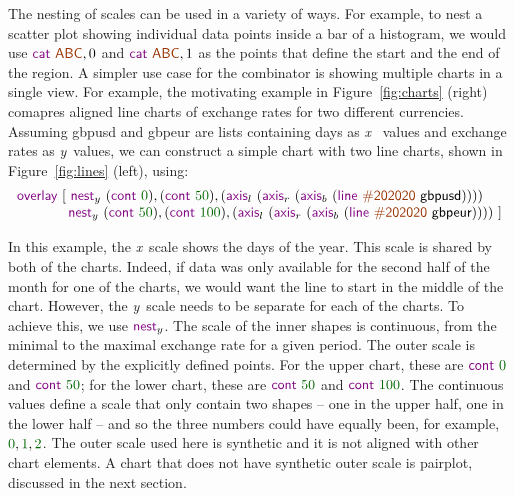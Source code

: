 \documentclass{jfp}
\newcommand{\X}{\emph{x}\ }
\newcommand{\Y}{\emph{y}\ }
\newcommand{\num}[1]{\textcolor{numclr}{#1}}
\newcommand{\strf}[1]{\textnormal{\textcolor{strclr}{\sffamily #1}}}
\newcommand{\ident}[1]{\textnormal{\textcolor{idclr}{\sffamily #1}}}
\newcommand{\kvd}[1]{\textnormal{\textcolor{kvdclr}{\sffamily #1}}}
\begin{document}
The nesting of scales can be used in a variety of ways. For example, to nest a scatter plot
showing individual data points inside a bar of a histogram, we would use $\kvd{cat}~\strf{ABC}, 0$
and $\kvd{cat}~\strf{ABC}, 1$ as the points that define the start and the end of the region. A simpler
use case for the combinator is showing multiple charts in a single view. For example, the motivating example
in Figure~\ref{fig:charts} (right) comapres aligned line charts of exchange rates for two
different currencies. Assuming \ident{gbpusd} and \ident{gbpeur} are lists containing days as \X
values and exchange rates as \Y values, we can construct a simple chart with two line charts,
shown in Figure~\ref{fig:lines} (left), using:
%
\begin{equation*}
\begin{array}{l}
\kvd{overlay}~[~
\kvd{nest}_y~(\kvd{cont}~\num{0}),(\kvd{cont}~\num{50}), (\kvd{axis}_l~(\kvd{axis}_r~(\kvd{axis}_b~(\kvd{line}~\strf{\#202020}~\ident{gbpusd}))))\\
\hspace{3.68em} \kvd{nest}_y~(\kvd{cont}~\num{50}),(\kvd{cont}~\num{100}), (\kvd{axis}_l~(\kvd{axis}_r~(\kvd{axis}_b~(\kvd{line}~\strf{\#202020}~\ident{gbpeur}))))~]\\
\end{array}
\end{equation*}

\vspace{-0.5em}
\noindent
In this example, the \X scale shows the days of the year. This scale is shared by both of the charts.
Indeed, if data was only available for the second half of the month for one of the charts,
we would want the line to start in the middle of the chart. However, the \Y scale needs to be
separate for each of the charts. To achieve this, we use $\kvd{nest}_y$. The scale of the inner
shapes is continuous, from the minimal to the maximal exchange rate for a given period. The
outer scale is determined by the explicitly defined points. For the upper chart, these are
$\kvd{cont}~\num{0}$ and $\kvd{cont}~\num{50}$; for the lower chart, these are
$\kvd{cont}~\num{50}$ and $\kvd{cont}~\num{100}$. The continuous values define a scale that only
contain two shapes -- one in the upper half, one in the lower half -- and so the three numbers could
have equally been, for example, $\num{0},\num{1}, \num{2}$. The outer scale used here is
synthetic and it is not aligned with other chart elements. A chart that does not have synthetic
outer scale is pairplot, discussed in the next section.
\end{document}
